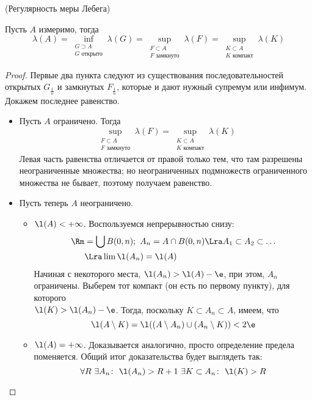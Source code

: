 \begin{corollary}(Регулярность меры Лебега)

    Пусть $A$ измеримо, тогда
\[
    \lambda(A) = \inf_{\substack{G \supset A \\ G \text{ открыто}}}{\lambda(G)}
    = \sup_{\substack{F \subset A \\ F \text{ замкнуто}}}{\lambda(F)}
    = \sup_{\substack{K \subset A \\ K \text{ компакт}}}{\lambda(K)}
\]
\end{corollary}
\begin{proof}
	Первые два пункта следуют из существования последовательностей открытых 
	$G_{\frac{1}{n}}$ и замкнутых $F_{\frac{1}{n}}$, которые и дают нужный 
	супремум или инфимум. Докажем последнее равенство.
	\begin{itemize}
		\item Пусть $A$ ограничено. Тогда 
\[
	\sup_{\substack{F \subset A \\ F \text{ замкнуто}}}{\lambda(F)} 
	= \sup_{\substack{K \subset A \\ K \text{ компакт}}}{\lambda(K)}
\]
	Левая часть равенства отличается от правой только тем, 
	что там разрешены неограниченные множества; но неограниченных подмножеств 
	ограниченного множества не бывает, поэтому получаем равенство.
		\item Пусть теперь $A$ неограничено.
			\begin{itemize}
				\item $\l(A) < +\infty$. Воспользуемся непрерывностью снизу:
\begin{align*}
	\Rm &= \bigcup{B(0, n)};~ A_n = A \cap B(0, n) \Lra A_1 \subset A_2 \subset \ldots\\
		&  \Lra \lim{\l(A_n)} = \l(A)
\end{align*}
				Начиная с некоторого места, $\l(A_n) > \l(A) - \e$, при этом, $A_n$ 
				ограничены. Выберем тот компакт (он есть по первому пункту), для которого \\
				$\l(K) > \l(A_n) - \e$. Тогда, поскольку $K \subset A_n \subset A$,
				имеем, что 
\[
		\l(A \setminus K) = \l((A \setminus A_n) \cup (A_n \setminus K)) < 2\e
\]
		\item $\l(A) = +\infty$. Доказывается аналогично, просто определение предела поменяется.
			Общий итог доказательства будет выглядеть так:
\[
	\forall R~ \exists A_n \colon~ \l(A_n) > R + 1~ \exists K \subset A_n\colon~ \l(K) > R
\]
			\end{itemize}
	\end{itemize}
\end{proof}

